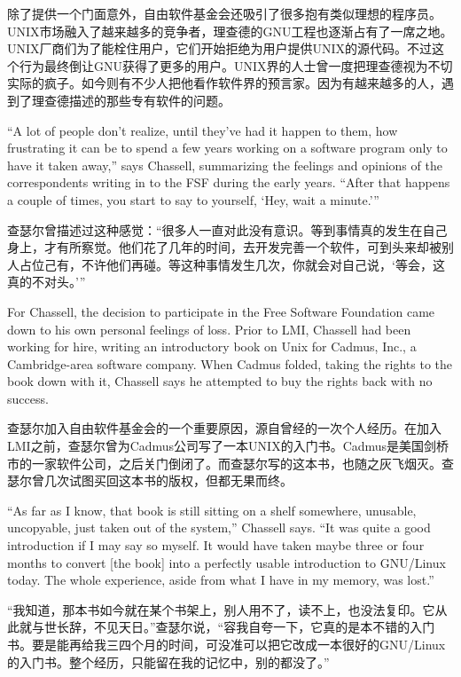 \ifdefined\chs
除了提供一个门面意外，自由软件基金会还吸引了很多抱有类似理想的程序员。UNIX市场融入了越来越多的竞争者，理查德的GNU工程也逐渐占有了一席之地。UNIX厂商们为了能栓住用户，它们开始拒绝为用户提供UNIX的源代码。不过这个行为最终倒让GNU获得了更多的用户。UNIX界的人士曾一度把理查德视为不切实际的疯子。如今则有不少人把他看作软件界的预言家。因为有越来越多的人，遇到了理查德描述的那些专有软件的问题。
\fi

\ifdefined\eng
``A lot of people don't realize, until they've had it happen to them, how frustrating it can be to spend a few years working on a software program only to have it taken away,'' says Chassell, summarizing the feelings and opinions of the correspondents writing in to the FSF during the early years. ``After that happens a couple of times, you start to say to yourself, `Hey, wait a minute.'\hspace{0.01in}''
\fi

\ifdefined\chs
查瑟尔曾描述过这种感觉：“很多人一直对此没有意识。等到事情真的发生在自己身上，才有所察觉。他们花了几年的时间，去开发完善一个软件，可到头来却被别人占位己有，不许他们再碰。等这种事情发生几次，你就会对自己说，‘等会，这真的不对头。’”
\fi

\ifdefined\eng
For Chassell, the decision to participate in the Free Software Foundation came down to his own personal feelings of loss. Prior to LMI, Chassell had been working for hire, writing an introductory book on Unix for Cadmus, Inc., a Cambridge-area software company. When Cadmus folded, taking the rights to the book down with it, Chassell says he attempted to buy the rights back with no success.
\fi

\ifdefined\chs
查瑟尔加入自由软件基金会的一个重要原因，源自曾经的一次个人经历。在加入LMI之前，查瑟尔曾为Cadmus公司写了一本UNIX的入门书。Cadmus是美国剑桥市的一家软件公司，之后关门倒闭了。而查瑟尔写的这本书，也随之灰飞烟灭。查瑟尔曾几次试图买回这本书的版权，但都无果而终。
\fi

\ifdefined\eng
``As far as I know, that book is still sitting on a shelf somewhere, unusable, uncopyable, just taken out of the system,'' Chassell says. ``It was quite a good introduction if I may say so myself. It would have taken maybe three or four months to convert [the book] into a perfectly usable introduction to GNU/Linux today. The whole experience, aside from what I have in my memory, was lost.''
\fi

\ifdefined\chs
“我知道，那本书如今就在某个书架上，别人用不了，读不上，也没法复印。它从此就与世长辞，不见天日。”查瑟尔说，“容我自夸一下，它真的是本不错的入门书。要是能再给我三四个月的时间，可没准可以把它改成一本很好的GNU/Linux的入门书。整个经历，只能留在我的记忆中，别的都没了。”
\fi

